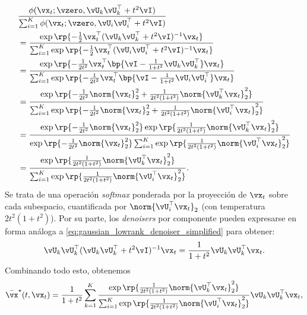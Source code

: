\documentclass[../../book-main.tex]{subfiles}
\begin{document}
\begin{align}
    &\frac{\phi(\vx_{t} ; \vzero, \vU_{k}\vU_{k}^{\top} + t^{2}\vI)}{\sum_{i
    = 1}^{K}\phi(\vx_{t} ; \vzero, \vU_{i}\vU_{i}^{\top} + t^{2}\vI)} \\
    &= \frac{\exp\rp{-\frac{1}{2}\vx_{t}^{\top}(\vU_{k}\vU_{k}^{\top}
    + t^{2}\vI)^{-1}\vx_{t}}}{\sum_{i =
        1}^{K}\exp\rp{-\frac{1}{2}\vx_{t}^{\top}(\vU_{i}\vU_{i}^{\top} +
    t^{2}\vI)^{-1}\vx_{t}}} \\
    &= \frac{\exp\rp{-\frac{1}{2t^{2}}\vx_{t}^{\top}\bp{\vI -
    \frac{1}{1 + t^{2}}\vU_{k}\vU_{k}^{\top}}\vx_{t}}}{\sum_{i =
        1}^{K}\exp\rp{-\frac{1}{2t^{2}}\vx_{t}^{\top}\bp{\vI - \frac{1}{1
    + t^{2}}\vU_{i}\vU_{i}^{\top}}\vx_{t}}} \\
    &= \frac{\exp\rp{-\frac{1}{2t^{2}}\norm{\vx_{t}}_{2}^{2} +
            \frac{1}{2t^{2}(1 +
    t^{2})}\norm{\vU_{k}^{\top}\vx_{t}}_{2}^{2}}}{\sum_{i =
        1}^{K}\exp\rp{-\frac{1}{2t^{2}}\norm{\vx_{t}}_{2}^{2} +
    \frac{1}{2t^{2}(1 + t^{2})}\norm{\vU_{i}^{\top}\vx_{t}}_{2}^{2}}} \\
    &=
    \frac{\exp\rp{-\frac{1}{2t^{2}}\norm{\vx_{t}}_{2}^{2}}\exp\rp{\frac{1}{2t^{2}(1
                    +
    t^{2})}\norm{\vU_{k}^{\top}\vx_{t}}_{2}^{2}}}{\exp\rp{-\frac{1}{2t^{2}}\norm{\vx_{t}}_{2}^{2}}\sum_{i
        = 1}^{K}\exp\rp{\frac{1}{2t^{2}(1 +
    t^{2})}\norm{\vU_{i}^{\top}\vx_{t}}_{2}^{2}}} \\
    &= \frac{\exp\rp{\frac{1}{2t^{2}(1 +
    t^{2})}\norm{\vU_{k}^{\top}\vx_{t}}_{2}^{2}}}{\sum_{i =
        1}^{K}\exp\rp{\frac{1}{2t^{2}(1 +
    t^{2})}\norm{\vU_{i}^{\top}\vx_{t}}_{2}^{2}}}.
\end{align}
Se trata de una operación \textit{softmax} ponderada por la proyección de \(\vx_{t}\)
sobre cada subespacio, cuantificada por \(\norm{\vU_{i}^{\top}\vx_{t}}_{2}\)
(con temperatura \(2t^{2}(1 + t^{2})\)). Por su parte, los
\textit{denoisers} por componente pueden expresarse en forma análoga a 
\eqref{eq:gaussian_lowrank_denoiser_simplified} para obtener:
\begin{equation}
    \vU_{k}\vU_{k}^{\top}(\vU_{k}\vU_{k}^{\top} +
    t^{2}\vI)^{-1}\vx_{t} = \frac{1}{1 + t^{2}}\vU_{k}\vU_{k}^{\top}\vx_{t}.
\end{equation}
Combinando todo esto, obtenemos
\begin{equation}\label{eq:gmm_lowrank_denoiser}
    \bar{\vx}^{\star}(t, \vx_{t}) = \frac{1}{1 + t^{2}}\sum_{k =
    1}^{K}\frac{\exp\rp{\frac{1}{2t^{2}(1 +
    t^{2})}\norm{\vU_{k}^{\top}\vx_{t}}_{2}^{2}}}{\sum_{i =
        1}^{K}\exp\rp{\frac{1}{2t^{2}(1 +
    t^{2})}\norm{\vU_{i}^{\top}\vx_{t}}_{2}^{2}}}\vU_{k}\vU_{k}^{\top}\vx_{t},
\end{equation}
\end{document}
